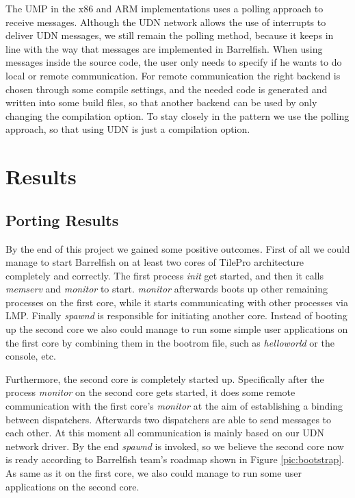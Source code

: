 \documentclass[a4paper,twoside]{report} %
\begin{document}
The UMP in the x86 and ARM implementations uses a polling approach to receive messages. Although the UDN network allows the use of interrupts to deliver UDN messages, we still remain the polling method, because it keeps in line with the way that messages are implemented in Barrelfish. When using messages inside the source code, the user only needs to specify if he wants to do local or remote communication. For remote communication the right backend is chosen through some compile settings, and the needed code is generated and written into some build files, so that another backend can be used by only changing the compilation option. To stay closely in the pattern we use the polling approach, so that using UDN is just a compilation option.


\chapter{Results}

\section{Porting Results}
By the end of this project we gained some positive outcomes. First of all we could manage to start Barrelfish on at least two cores of TilePro architecture completely and correctly. The first process \emph{init} get started, and then it calls \emph{mem{\textunderscore}serv} and \emph{monitor} to start. \emph{monitor} afterwards boots up other remaining processes on the first core, while it starts communicating with other processes via LMP. Finally \emph{spawnd} is responsible for initiating another core. Instead of booting up the second core we also could manage to run some simple user applications on the first core by combining them in the bootrom file, such as \emph{helloworld} or the console, etc.

Furthermore, the second core is completely started up. Specifically after the process \emph{monitor} on the second core gets started, it does some remote communication with the first core's \emph{monitor} at the aim of establishing a binding between dispatchers. Afterwards two dispatchers are able to send messages to each other. At this moment all communication is mainly based on our UDN network driver. By the end \emph{spawnd} is invoked, so we believe the second core now is ready according to Barrelfish team's roadmap shown in Figure \ref{pic:bootstrap}. As same as it on the first core, we also could manage to run some user applications on the second core.
\end{document}
